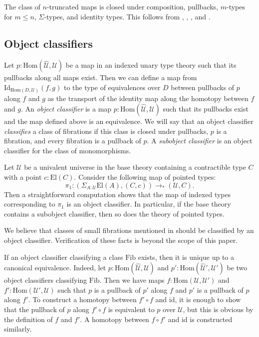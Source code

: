 \documentclass[reqno]{mscs}
\newcommand{\fs}[1]{\mathrm{#1}}
\newcommand{\Hom}{\fs{Hom}}
\newcommand{\Id}{\fs{Id}}
\newcommand{\id}{\fs{id}}
\newcommand{\Fib}{\fs{Fib}}
\newcommand{\El}{\fs{El}}
\numberwithin{figure}{section}
\begin{document}
\begin{example}
The class of $n$-truncated maps is closed under composition, pullbacks, $m$-types for $m \leq n$, $\Sigma$-types, and identity types.
This follows from , , , and .
\end{example}

\subsection{Object classifiers}

Let $p : \Hom(\widehat{\mathcal{U}},\mathcal{U})$ be a map in an indexed unary type theory such that its pullbacks along all maps exist.
Then we can define a map from $\Id_{\Hom(D,\mathcal{U})}(f,g)$ to the type of equivalences over $D$ between pullbacks of $p$ along $f$ and $g$ as the transport of the identity map along the homotopy between $f$ and $g$.
An \emph{object classifier} is a map $p : \Hom(\widehat{\mathcal{U}},\mathcal{U})$ such that its pullbacks exist and the map defined above is an equivalence.
We will say that an object classifier \emph{classifies} a class of fibrations if this class is closed under pullbacks, $p$ is a fibration, and every fibration is a pullback of $p$.
A \emph{subobject classifier} is an object classifier for the class of monomorphisms.

\begin{example}
Let $\mathcal{U}$ be a univalent universe in the base theory containing a contractible type $C$ with a point $c : \El(C)$.
Consider the following map of pointed types:
\[ \pi_1 : (\Sigma_{A : \mathcal{U}} \El(A), (C, c)) \to_* (\mathcal{U}, C). \]
Then a straightforward computation shows that the map of indexed types corresponding to $\pi_1$ is an object classifier.
In particular, if the base theory contains a subobject classifier, then so does the theory of pointed types.
\end{example}

\begin{example}
We believe that classes of small fibrations mentioned in  should be classified by an object classifier.
Verification of these facts is beyond the scope of this paper.
\end{example}

If an object classifier classifying a class $\Fib$ exists, then it is unique up to a canonical equivalence.
Indeed, let $p : \Hom(\widehat{\mathcal{U}},\mathcal{U})$ and $p' : \Hom(\widehat{\mathcal{U}}',\mathcal{U}')$ be two object classifiers classifying $\Fib$.
Then we have maps $f : \Hom(\mathcal{U},\mathcal{U}')$ and $f' : \Hom(\mathcal{U}',\mathcal{U})$ such that $p$ is a pullback of $p'$ along $f$ and $p'$ is a pullback of $p$ along $f'$.
To construct a homotopy between $f' \circ f$ and $\id$, it is enough to show that the pullback of $p$ along $f' \circ f$ is equivalent to $p$ over $\mathcal{U}$, but this is obvious by the definition of $f$ and $f'$.
A homotopy between $f \circ f'$ and $\id$ is constructed similarly.
\end{document}
